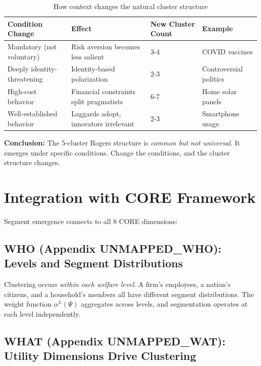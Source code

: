 \begin{table}[h]
\centering
\small
\begin{tabular}{llll}
\toprule
\textbf{Condition Change} & \textbf{Effect} & \textbf{New Cluster Count} & \textbf{Example} \\
\midrule
Mandatory (not voluntary) & Risk aversion becomes less salient & 3-4 & COVID vaccines \\
Deeply identity-threatening & Identity-based polarization & 2-3 & Controversial politics \\
High-cost behavior & Financial constraints split pragmatists & 6-7 & Home solar panels \\
Well-established behavior & Laggards adopt, innovators irrelevant & 2-3 & Smartphone usage \\
\bottomrule
\end{tabular}
\caption{How context changes the natural cluster structure}
\label{tab:cluster-variance}
\end{table}

\textbf{Conclusion:} The 5-cluster Rogers structure is \textit{common but not universal}.
It emerges under specific conditions. Change the conditions, and the cluster
structure changes.

\section{Integration with CORE Framework}
\label{sec:ba-integration}

Segment emergence connects to all 8 CORE dimensions:

\subsection{WHO (Appendix UNMAPPED_WHO): Levels and Segment Distributions}

Clustering occurs \textit{within each welfare level}. A firm's employees, a
nation's citizens, and a household's members all have different segment distributions.
The weight function $\alpha^L(\Psi)$ aggregates across levels, and segmentation
operates at each level independently.

\subsection{WHAT (Appendix UNMAPPED_WAT): Utility Dimensions Drive Clustering}

